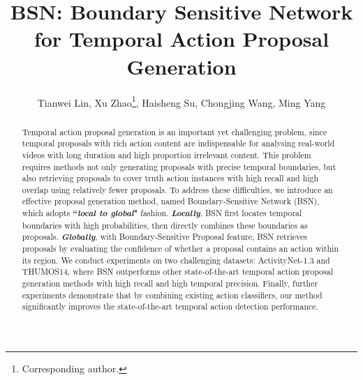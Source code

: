 \documentclass[runningheads]{llncs}
\begin{document}
\pagestyle{headings}
\mainmatter

\title{BSN: Boundary Sensitive Network for Temporal Action Proposal Generation} 







\author{Tianwei Lin, Xu Zhao\thanks{ Corresponding author.}, Haisheng Su, Chongjing Wang, Ming Yang}











\maketitle

\vspace{-0.5cm}

\begin{abstract}

Temporal action proposal generation is an important yet challenging problem, since temporal proposals with rich action content  are indispensable for analysing real-world videos with long duration and high proportion irrelevant content.
This problem requires methods not only generating proposals with precise temporal boundaries, but also retrieving proposals to cover truth action instances with high recall and high overlap using relatively fewer proposals.
To address these difficulties, we introduce an effective proposal generation method, named  Boundary-Sensitive Network (BSN), which adopts {\bf ``\emph{local to global}"} fashion.
{\bf \emph{Locally}}, BSN first locates temporal boundaries with high probabilities, then directly combines these boundaries as proposals.
{\bf \emph{Globally}},  with Boundary-Sensitive Proposal feature, BSN retrieves proposals by evaluating the confidence of whether a proposal contains an action within its region. 
We conduct experiments on two challenging datasets: ActivityNet-1.3 and THUMOS14, where BSN outperforms other state-of-the-art temporal action proposal generation methods with high recall and high temporal precision. 
Finally, further experiments demonstrate that by combining existing action classifiers, our method significantly improves the state-of-the-art temporal action detection performance.
\end{abstract}
\end{document}
